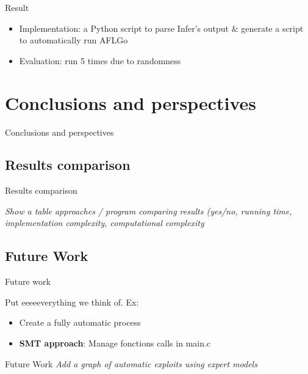 \documentclass{beamer}
\begin{document}
\begin{frame}{Result}
\begin{itemize}
	\item Implementation: a Python script to parse Infer's output \& generate a script to automatically run AFLGo
	\item Evaluation: run 5 times due to randomness
\end{itemize}

\end{frame}


\section{Conclusions and perspectives}

\begin{frame}
\centering
\LARGE Conclusions and perspectives
\end{frame}

\subsection{Results comparison}

\begin{frame}{Results comparison}

\textit{Show a table approaches / program comparing results (yes/no, running time, implementation complexity, computational complexity } \\

\end{frame}

\subsection{Future Work}
\begin{frame}{Future work}

Put eeeeeverything we think of. Ex:

\begin{itemize}
\item Create a fully automatic process
\item \textbf{SMT approach}: Manage fonctions calls in main.c 
\end{itemize}

\end{frame}

\begin{frame}{Future Work}
\textit{Add a graph of automatic exploits using expert models}
\end{frame}
\end{document}
